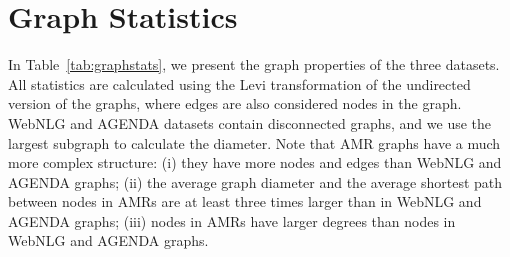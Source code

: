 \documentclass[11pt]{article}
\begin{document}
\section{Graph Statistics}
\label{sec:graphstats}


In Table~\ref{tab:graphstats}, we present the graph properties of the three datasets. All statistics are calculated using the Levi transformation \cite{beck-etal-2018-acl2018} of the undirected version of the graphs, where edges are also considered nodes in the graph. WebNLG and AGENDA datasets contain disconnected graphs, and we use the largest subgraph to calculate the diameter. Note that AMR graphs have a much more complex structure: (i) they have more nodes and edges than WebNLG and AGENDA graphs; (ii) the average graph diameter and the average shortest path between nodes in AMRs are at least three times larger than in WebNLG and AGENDA graphs; (iii) nodes in AMRs have larger degrees than nodes in WebNLG and AGENDA graphs.

\vspace{15mm}
\end{document}
